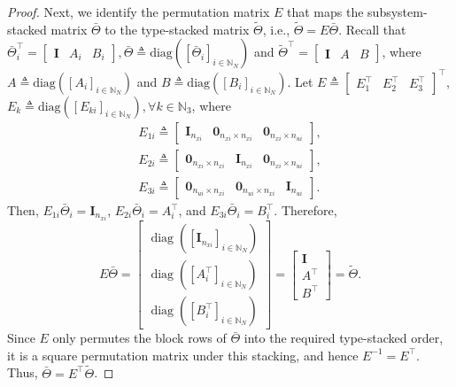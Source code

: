 \documentclass[letterpaper, 10 pt, conference]{ieeeconf}%
\newcommand{\N}{\mathbb{N}}
\newcommand{\T}{\top}
\newcommand{\I}{\mathbf{I}}
\newcommand{\0}{\mathbf{0}}
\newcommand{\diag}{\text{diag}}
\newcommand{\bm}[1]{\begin{bmatrix}#1\end{bmatrix}}
\begin{document}
\begin{proof}
Next, we identify the permutation matrix $E$ that maps the subsystem-stacked matrix $\bar{\Theta}$ to the type-stacked matrix $\tilde{\Theta}$, i.e., $\tilde{\Theta}=E\bar{\Theta}$. Recall that 
$\bar{\Theta}_i^\T=\bm{\I & A_i & B_i}, 
\bar{\Theta}\triangleq\diag([\bar{\Theta}_i]_{i\in\N_N})$ and $\tilde{\Theta}^\T=\bm{\I & A & B}$, where $A\triangleq\diag([A_i]_{i\in\N_N})$ and $B\triangleq\diag([B_i]_{i\in\N_N})$. Let 
$E \triangleq \bm{E_1^\T & E_2^\T & E_3^\T}^\T$, $E_k \triangleq \diag([E_{ki}]_{i\in\N_N}), \forall k\in\N_3$, where  
\begin{gather*}
E_{1i} \triangleq \bm{\I_{n_{xi}} & \0_{n_{xi}\times n_{xi}} & \0_{n_{xi}\times n_{ui}}},\\ 
E_{2i} \triangleq \bm{\0_{n_{xi}\times n_{xi}} & \I_{n_{xi}} & \0_{n_{xi}\times n_{ui}}},\\
E_{3i} \triangleq \bm{\0_{n_{ui}\times n_{xi}} & \0_{n_{ui}\times n_{xi}} & \I_{n_{ui}}}.
\end{gather*}
Then, 
$E_{1i}\bar{\Theta}_i=\I_{n_{xi}}$, 
$E_{2i}\bar{\Theta}_i=A_i^\T$, and 
$E_{3i}\bar{\Theta}_i=B_i^\T$. 
Therefore,
\[ E\bar{\Theta} = \begin{bmatrix} \operatorname{diag}\!\left([\I_{n_{xi}}]_{i\in\N_N}\right)\\[2mm] \operatorname{diag}\!\left([A_i^\T]_{i\in\N_N}\right)\\[2mm] \operatorname{diag}\!\left([B_i^\T]_{i\in\N_N}\right) \end{bmatrix} = \begin{bmatrix} \I\\ A^\T\\ B^\T \end{bmatrix} = \tilde{\Theta}. \] Since $E$ only permutes the block rows of $\bar{\Theta}$ into the required type-stacked order, it is a square permutation matrix under this stacking, and hence $E^{-1}=E^\T$. Thus, $\bar{\Theta}=E^\T\tilde{\Theta}$.


\end{proof}
\end{document}
